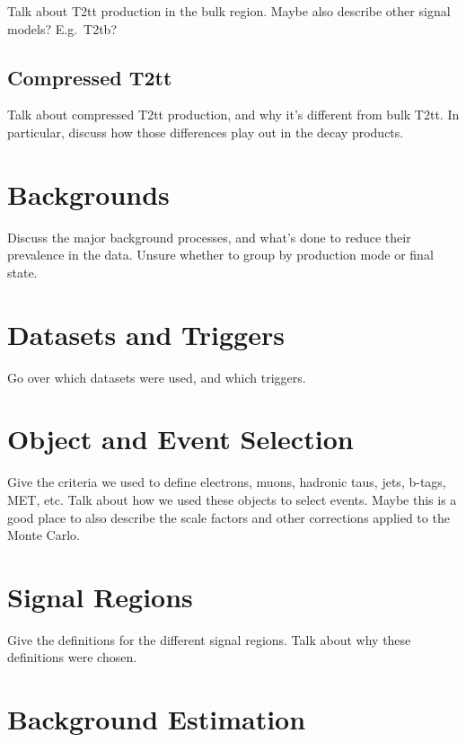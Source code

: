 Talk about T2tt production in the bulk region.
Maybe also describe other signal models?
E.g.~T2tb?

\subsection{Compressed T2tt}
\label{ssec:stop:sigcompressed}

Talk about compressed T2tt production, and why it's different from bulk T2tt.
In particular, discuss how those differences play out in the decay products.

\section{Backgrounds}
\label{sec:stop:bkgs}

Discuss the major background processes, and what's done to
reduce their prevalence in the data.
Unsure whether to group by production mode or final state.

\section{Datasets and Triggers}
\label{sec:stop:datatrig}

Go over which datasets were used, and which triggers.

\section{Object and Event Selection}
\label{sec:stop:selections}

Give the criteria we used to define electrons, muons, hadronic taus,
jets, b-tags, MET, etc.
Talk about how we used these objects to select events.
Maybe this is a good place to also describe the scale factors and
other corrections applied to the Monte Carlo.

\section{Signal Regions}
\label{sec:stop:sigregs}

Give the definitions for the different signal regions.
Talk about why these definitions were chosen.

\section{Background Estimation}
\label{sec:stop:bkgest}

